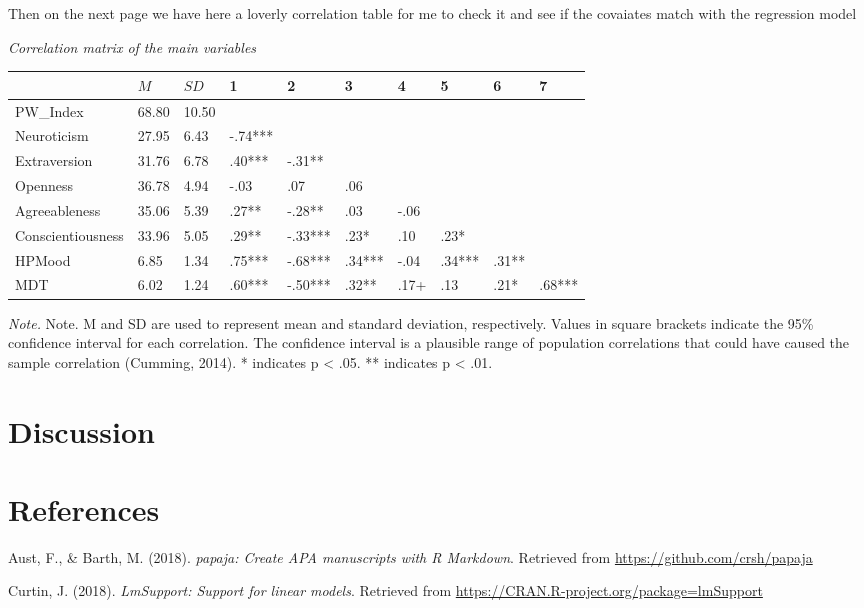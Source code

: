 \documentclass[man,floatsintext]{apa6}
\begin{document}
Then on the next page we have here a loverly correlation table for me to
check it and see if the covaiates match with the regression model

\label{tab:unnamed-chunk-2}

\emph{Correlation matrix of the main variables}

\begin{longtable}[]{@{}llllllllll@{}}
\toprule
& \(M\) & \(SD\) & 1 & 2 & 3 & 4 & 5 & 6 & 7\tabularnewline
\midrule
\endhead
PW\_Index & 68.80 & 10.50 & & & & & & &\tabularnewline
Neuroticism & 27.95 & 6.43 & -.74*** & & & & & &\tabularnewline
Extraversion & 31.76 & 6.78 & .40*** & -.31** & & & & &\tabularnewline
Openness & 36.78 & 4.94 & -.03 & .07 & .06 & & & &\tabularnewline
Agreeableness & 35.06 & 5.39 & .27** & -.28** & .03 & -.06 & &
&\tabularnewline
Conscientiousness & 33.96 & 5.05 & .29** & -.33*** & .23* & .10 & .23* &
&\tabularnewline
HPMood & 6.85 & 1.34 & .75*** & -.68*** & .34*** & -.04 & .34*** & .31**
&\tabularnewline
MDT & 6.02 & 1.24 & .60*** & -.50*** & .32** & .17+ & .13 & .21* &
.68***\tabularnewline
\bottomrule
\end{longtable}

\emph{Note.} Note. M and SD are used to represent mean and standard
deviation, respectively. Values in square brackets indicate the 95\%
confidence interval for each correlation. The confidence interval is a
plausible range of population correlations that could have caused the
sample correlation (Cumming, 2014). * indicates p \textless{} .05. **
indicates p \textless{} .01.

\section{Discussion}\label{discussion}

\newpage

\section{References}\label{references}

\begingroup
\setlength{\parindent}{-0.5in} \setlength{\leftskip}{0.5in}

\hypertarget{refs}{}
\hypertarget{ref-R-papaja}{}
Aust, F., \& Barth, M. (2018). \emph{papaja: Create APA manuscripts with
R Markdown}. Retrieved from \url{https://github.com/crsh/papaja}

\hypertarget{ref-R-lmSupport}{}
Curtin, J. (2018). \emph{LmSupport: Support for linear models}.
Retrieved from \url{https://CRAN.R-project.org/package=lmSupport}
\end{document}
